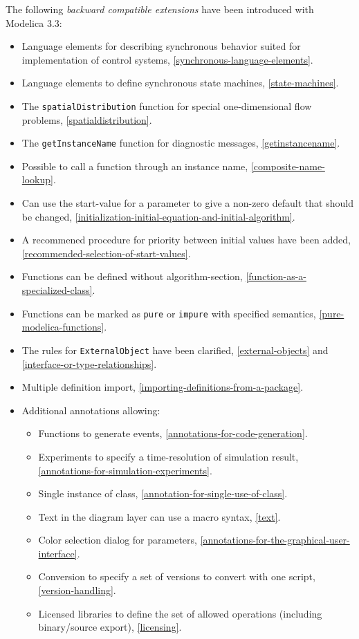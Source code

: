 The following \emph{backward compatible extensions} have been introduced with Modelica 3.3:
\begin{itemize}
\item
  Language elements for describing synchronous behavior suited for
  implementation of control systems, \cref{synchronous-language-elements}.
\item
  Language elements to define synchronous state machines, \cref{state-machines}.
\item
  The \lstinline!spatialDistribution! function for special one-dimensional flow problems, \cref{spatialdistribution}.
\item
  The \lstinline!getInstanceName! function for diagnostic messages, \cref{getinstancename}.
\item
  Possible to call a function through an instance name, \cref{composite-name-lookup}.
\item
  Can use the start-value for a parameter to give a non-zero default
  that should be changed, \cref{initialization-initial-equation-and-initial-algorithm}.
\item
  A recommened procedure for priority between initial values have been
  added, \cref{recommended-selection-of-start-values}.
\item
  Functions can be defined without algorithm-section, \cref{function-as-a-specialized-class}.
\item
  Functions can be marked as \lstinline!pure! or \lstinline!impure! with specified semantics, \cref{pure-modelica-functions}.
\item
  The rules for \lstinline!ExternalObject! have been clarified, \cref{external-objects} and \cref{interface-or-type-relationships}.
\item
  Multiple definition import, \cref{importing-definitions-from-a-package}.
\item
  Additional annotations allowing:
  \begin{itemize}
  \item
    Functions to generate events, \cref{annotations-for-code-generation}.
  \item
    Experiments to specify a time-resolution of simulation result,
    \cref{annotations-for-simulation-experiments}.
  \item
    Single instance of class, \cref{annotation-for-single-use-of-class}.
  \item
    Text in the diagram layer can use a macro syntax, \cref{text}.
  \item
    Color selection dialog for parameters, \cref{annotations-for-the-graphical-user-interface}.
  \item
    Conversion to specify a set of versions to convert with one script,
    \cref{version-handling}.
  \item
    Licensed libraries to define the set of allowed operations
    (including binary/source export), \cref{licensing}.
  \end{itemize}
\end{itemize}

